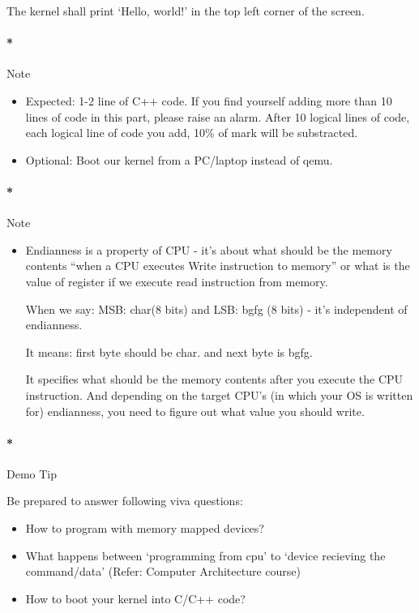 \documentclass[]{article}
\providecommand{\tightlist}{%
  \setlength{\itemsep}{0pt}\setlength{\parskip}{0pt}}
\let\oldparagraph\paragraph
\renewcommand{\paragraph}[1]{\oldparagraph{#1}\mbox{}}
\begin{document}
The kernel shall print `Hello, world!' in the top left corner of the
screen.

\paragraph*{Note}\label{note}

\begin{itemize}
\tightlist
\item
  Expected: 1-2 line of C++ code. If you find yourself adding more than
  10 lines of code in this part, please raise an alarm. After 10 logical
  lines of code, each logical line of code you add, 10\% of mark will be
  substracted.
\item
  Optional: Boot our kernel from a PC/laptop instead of qemu.
\end{itemize}

\paragraph*{Note}\label{note-1}

\begin{itemize}
\item
  Endianness is a property of CPU - it's about what should be the memory
  contents ``when a CPU executes Write instruction to memory'' or what
  is the value of register if we execute read instruction from memory.

  When we say: MSB: char(8 bits) and LSB: bgfg (8 bits) - it's
  independent of endianness.

  It means: first byte should be char. and next byte is bgfg.

  It specifies what should be the memory contents after you execute the
  CPU instruction. And depending on the target CPU's (in which your OS
  is written for) endianness, you need to figure out what value you
  should write.
\end{itemize}

\paragraph*{Demo Tip}\label{demo-tip}

Be prepared to answer following viva questions:

\begin{itemize}
\tightlist
\item
  How to program with memory mapped devices?
\item
  What happens between `programming from cpu' to `device recieving the
  command/data' (Refer: Computer Architecture course)
\item
  How to boot your kernel into C/C++ code?
\end{itemize}
\end{document}
